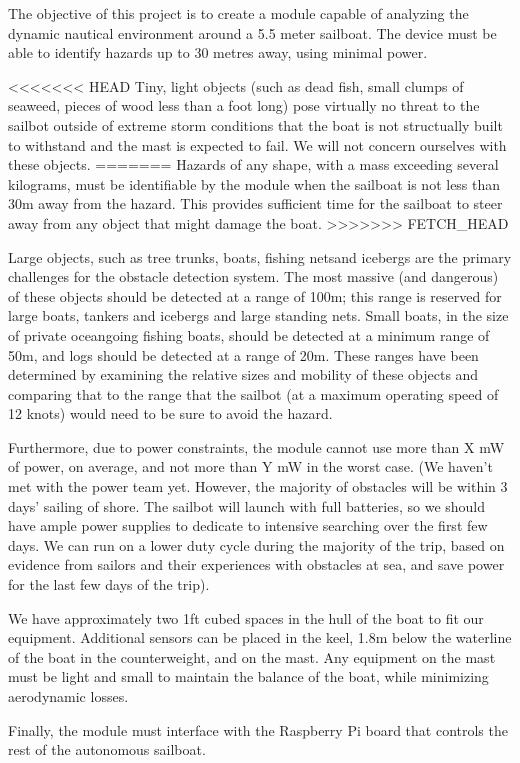 The objective of this project is to create a module capable of analyzing the dynamic nautical environment around a 5.5 meter sailboat. The device must be able to identify hazards up to 30 metres away, using minimal power.

<<<<<<< HEAD
Tiny, light objects (such as dead fish, small clumps of seaweed, pieces of wood less than a foot long) pose virtually no threat to the sailbot outside of extreme storm conditions that the boat is not structually built to withstand and the mast is expected to fail. We will not concern ourselves with these objects. 
=======
Hazards of any shape, with a mass exceeding several kilograms, must be identifiable by the module when the sailboat is not less than 30m away from the hazard. This provides sufficient time for the sailboat to steer away from any object that might damage the boat.
>>>>>>> FETCH_HEAD

Large objects, such as tree trunks, boats, fishing netsand icebergs are the primary challenges for the obstacle detection system. The most massive (and dangerous) of these objects should be detected at a range of 100m; this range is reserved for large boats, tankers and icebergs and large standing nets. Small boats, in the size of private oceangoing fishing boats, should be detected at a minimum range of 50m, and logs should be detected at a range of 20m. These ranges have been determined by examining the relative sizes and mobility of these objects and comparing that to the range that the sailbot (at a maximum operating speed of 12 knots) would need to be sure to avoid the hazard.

Furthermore, due to power constraints, the module cannot use more than X mW of power, on average, and not more than Y mW in the worst case. (We haven't met with the power team yet. However, the majority of obstacles will be within 3 days' sailing of shore. The sailbot will launch with full batteries, so we should have ample power supplies to dedicate to intensive searching over the first few days. We can run on a lower duty cycle during the majority of the trip, based on evidence from sailors and their experiences with obstacles at sea, and save power for the last few days of the trip).

We have approximately two 1ft cubed spaces in the hull of the boat to fit our equipment. Additional sensors can be placed in the keel, 1.8m below the waterline of the boat in the counterweight, and on the mast. Any equipment on the mast must be light and small to maintain the balance of the boat, while minimizing aerodynamic losses.

Finally, the module must interface with the Raspberry Pi board that controls the rest of the autonomous sailboat.